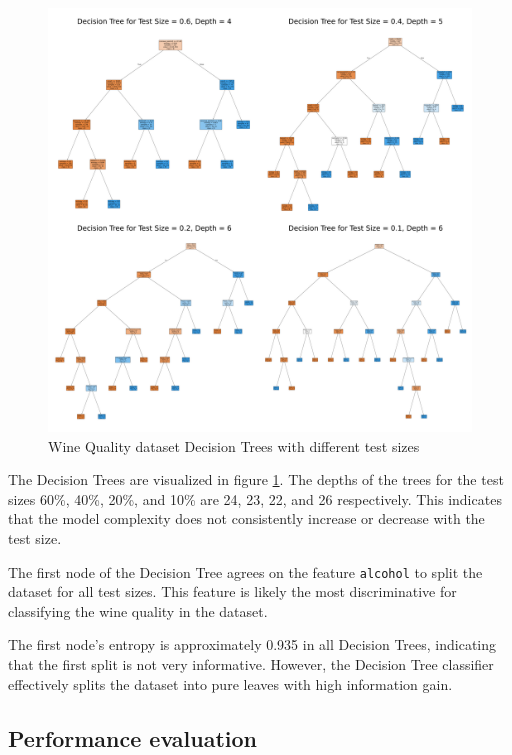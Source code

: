 \begin{figure}[H]
    \centering
    \includegraphics[width=\textwidth]{figures/breast_cancer_wisconsin_decision_trees.pdf}
    \caption{Wine Quality dataset Decision Trees with different test sizes}
    \label{fig:wine_quality_decision_trees}
\end{figure}

The Decision Trees are visualized in figure \ref{fig:wine_quality_decision_trees}. 
The depths of the trees for the test sizes 60\%, 40\%, 20\%, and 10\% are 24, 23, 22, and 26 respectively. This indicates that the model complexity does not consistently increase or decrease with the test size.

The first node of the Decision Tree agrees on the feature \texttt{alcohol} to split the dataset for all test sizes. This feature is likely the most discriminative for classifying the wine quality in the dataset.

The first node's entropy is approximately 0.935 in all Decision Trees, indicating that the first split is not very informative. However, the Decision Tree classifier effectively splits the dataset into pure leaves with high information gain.

\subsection{Performance evaluation}

